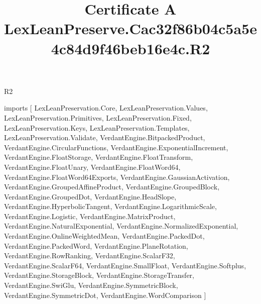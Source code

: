\begin{lexlean}{R2}
\title{Certificate A LexLeanPreserve.Cac32f86b04c5a5e4c84d9f46beb16e4c.R2}
\begin{coremodule}
imports [
  LexLeanPreservation.Core,
  LexLeanPreservation.Values,
  LexLeanPreservation.Primitives,
  LexLeanPreservation.Fixed,
  LexLeanPreservation.Keys,
  LexLeanPreservation.Templates,
  LexLeanPreservation.Validate,
  VerdantEngine.BitpackedProduct,
  VerdantEngine.CircularFunctions,
  VerdantEngine.ExponentialIncrement,
  VerdantEngine.FloatStorage,
  VerdantEngine.FloatTransform,
  VerdantEngine.FloatUnary,
  VerdantEngine.FloatWord64,
  VerdantEngine.FloatWord64Exports,
  VerdantEngine.GaussianActivation,
  VerdantEngine.GroupedAffineProduct,
  VerdantEngine.GroupedBlock,
  VerdantEngine.GroupedDot,
  VerdantEngine.HeadSlope,
  VerdantEngine.HyperbolicTangent,
  VerdantEngine.LogarithmicScale,
  VerdantEngine.Logistic,
  VerdantEngine.MatrixProduct,
  VerdantEngine.NaturalExponential,
  VerdantEngine.NormalizedExponential,
  VerdantEngine.OnlineWeightedMean,
  VerdantEngine.PackedDot,
  VerdantEngine.PackedWord,
  VerdantEngine.PlaneRotation,
  VerdantEngine.RowRanking,
  VerdantEngine.ScalarF32,
  VerdantEngine.ScalarF64,
  VerdantEngine.SmallFloat,
  VerdantEngine.Softplus,
  VerdantEngine.StorageBlock,
  VerdantEngine.StorageTransfer,
  VerdantEngine.SwiGlu,
  VerdantEngine.SymmetricBlock,
  VerdantEngine.SymmetricDot,
  VerdantEngine.WordComparison
]


\end{coremodule}
\end{lexlean}
